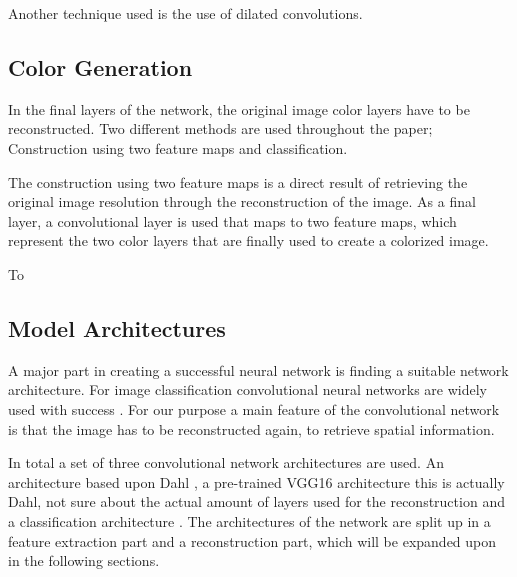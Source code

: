 {\color{red}Another technique used is the use of dilated convolutions.} %

\subsection{Color Generation}
In the final layers of the network, the original image color layers have to be reconstructed. Two different methods are used throughout the paper; Construction using two feature maps and classification.

The construction using two feature maps is a direct result of retrieving the original image resolution through the reconstruction of the image. As a final layer, a convolutional layer is used that maps to two feature maps, which represent the two color layers that are finally used to create a colorized image.

To 





 
\subsection{Model Architectures}
A major part in creating a successful neural network is finding a suitable network architecture. For image classification convolutional neural networks are widely used with success \cite{Krizhevsky,Szegedy,Simonyan}. For our purpose a main feature of the convolutional network is that the image has to be reconstructed again, to retrieve spatial information.

{\color{red} 
In total a set of three convolutional network architectures are used. An architecture based upon Dahl \cite{Dahl}, a pre-trained VGG16 \cite{Simonyan} architecture {\color{red} this is actually Dahl,  not sure about the actual amount of layers used for the reconstruction} and a classification architecture \cite{Zhang}. The architectures of the network are split up in a feature extraction part and a reconstruction part, which will be expanded upon in the following sections.}\\ 
\\%

